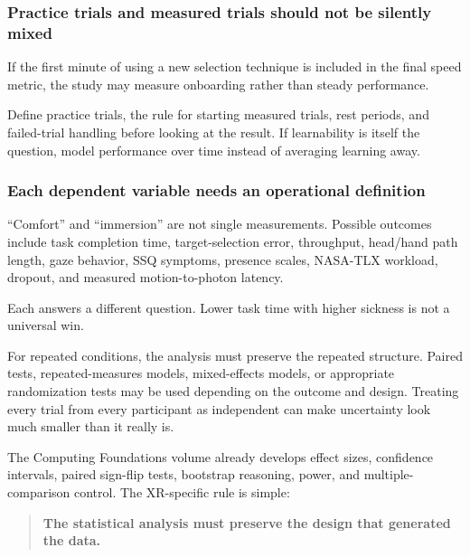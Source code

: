 \begin{allmightroleexercise}

\subsubsection{Practice trials and measured trials should not be silently mixed}\label{04-visual-computing-ii-ch035-practice-trials-and-measured-trials-should-not-be-silently-mixed}

If the first minute of using a new selection technique is included in the final speed metric, the study may measure onboarding rather than steady performance.

\end{allmightroleexercise}

Define practice trials, the rule for starting measured trials, rest periods, and failed-trial handling before looking at the result. If learnability is itself the question, model performance over time instead of averaging learning away.

\subsubsection{Each dependent variable needs an operational definition}\label{04-visual-computing-ii-ch035-each-dependent-variable-needs-an-operational-definition}

``Comfort'' and ``immersion'' are not single measurements. Possible outcomes include task completion time, target-selection error, throughput, head/hand path length, gaze behavior, SSQ symptoms, presence scales, NASA-TLX workload, dropout, and measured motion-to-photon latency.

Each answers a different question. Lower task time with higher sickness is not a universal win.

For repeated conditions, the analysis must preserve the repeated structure. Paired tests, repeated-measures models, mixed-effects models, or appropriate randomization tests may be used depending on the outcome and design. Treating every trial from every participant as independent can make uncertainty look much smaller than it really is.

The Computing Foundations volume already develops effect sizes, confidence intervals, paired sign-flip tests, bootstrap reasoning, power, and multiple-comparison control. The XR-specific rule is simple:

\begin{quote}
\textbf{The statistical analysis must preserve the design that generated the data.}
\end{quote}

